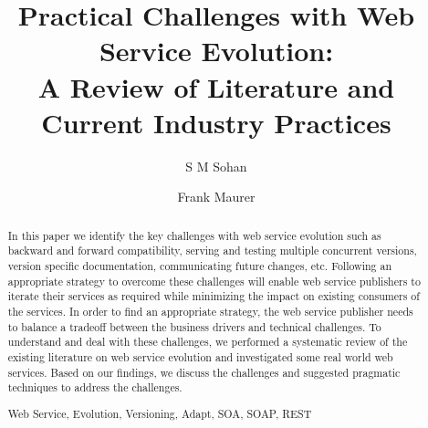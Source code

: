 \documentclass[runningheads,a4paper]{llncs}
\newcommand{\keywords}[1]{\par\addvspace\baselineskip
\noindent\keywordname\enspace\ignorespaces#1}
\begin{document}
\mainmatter  %

\title{Practical Challenges with Web Service Evolution:\\A Review of Literature and Current Industry Practices}


%
%
\author{S M Sohan%
\and Frank Maurer}
%


%
%

\maketitle


\begin{abstract}


In this paper we identify the key challenges with web service evolution such as backward and forward compatibility, serving and testing multiple concurrent versions, version specific documentation, communicating future changes, etc. Following an appropriate strategy to overcome these challenges will enable web service publishers to iterate their services as required while minimizing the impact on existing consumers of the services. In order to find an appropriate strategy, the web service publisher needs to balance a tradeoff between the business drivers and technical challenges. To understand and deal with these challenges, we performed a systematic review of the existing literature on web service evolution and investigated some real world web services. Based on our findings, we discuss the challenges and suggested pragmatic techniques to address the challenges.

\keywords{Web Service, Evolution, Versioning, Adapt, SOA, SOAP, REST}
\end{abstract}
\end{document}
